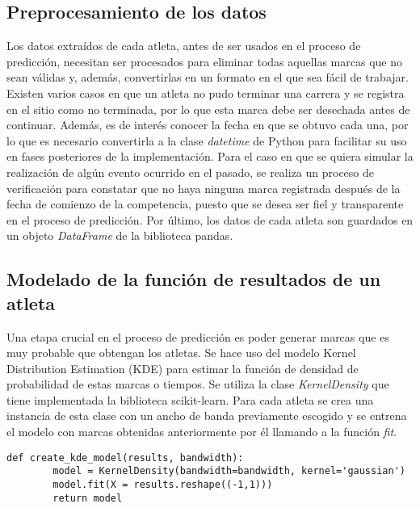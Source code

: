 \subsection{Preprocesamiento de los datos}

Los datos extraídos de cada atleta, antes de ser usados en el proceso de predicción, necesitan ser procesados para eliminar todas aquellas marcas que no sean válidas y, además, convertirlas en un formato en el que sea fácil de trabajar. Existen varios casos en que un atleta no pudo terminar una carrera y se registra en el sitio como no terminada, por lo que esta marca debe ser desechada antes de continuar. Además, es de interés conocer la fecha en que se obtuvo cada una, por lo que es necesario convertirla a la clase \textit{datetime} de Python para facilitar su uso en fases posteriores de la implementación. Para el caso en que se quiera simular la realización de algún evento ocurrido en el pasado, se realiza un proceso de verificación para constatar que no haya ninguna marca registrada después de la fecha de comienzo de la competencia, puesto que se desea ser fiel y transparente en el proceso de predicción. Por último, los datos de cada atleta son guardados en un objeto \textit{DataFrame} de la biblioteca pandas.

\subsection{Modelado de la función de resultados de un atleta}

Una etapa crucial en el proceso de predicción es poder generar marcas que es muy probable que obtengan los atletas. Se hace uso del modelo Kernel Distribution Estimation (KDE) para estimar la función de densidad de probabilidad de estas marcas o tiempos. Se utiliza la clase \textit{KernelDensity} que tiene implementada la biblioteca scikit-learn. Para cada atleta se crea una instancia de esta clase con un ancho de banda previamente escogido y se entrena el modelo con marcas obtenidas anteriormente por él llamando a la función \textit{fit}.


\begin{lstlisting}[caption= Modelado y entrenamiento de la función de resultados de un atleta, label = code:kde]
    def create_kde_model(results, bandwidth):
        model = KernelDensity(bandwidth=bandwidth, kernel='gaussian')
        model.fit(X = results.reshape((-1,1)))
        return model
\end{lstlisting}

